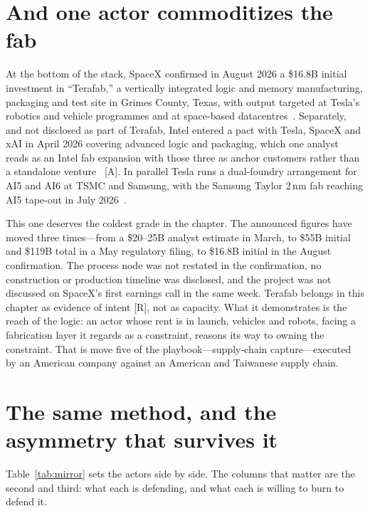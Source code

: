 \section{And one actor commoditizes the fab}
\label{sec:mirror-fab}

At the bottom of the stack, SpaceX confirmed in August 2026 a \$16.8B initial investment in ``Terafab,'' a vertically integrated logic and memory manufacturing, packaging and test site in Grimes County, Texas, with output targeted at Tesla's robotics and vehicle programmes and at space-based datacentres~\cite{terafab}. Separately, and not disclosed as part of Terafab, Intel entered a pact with Tesla, SpaceX and xAI in April 2026 covering advanced logic and packaging, which one analyst reads as an Intel fab expansion with those three as anchor customers rather than a standalone venture~\cite{terafab} [A]. In parallel Tesla runs a dual-foundry arrangement for AI5 and AI6 at TSMC and Samsung, with the Samsung Taylor 2\,nm fab reaching AI5 tape-out in July 2026~\cite{tesla-ai5}.

This one deserves the coldest grade in the chapter. The announced figures have moved three times---from a \$20--25B analyst estimate in March, to \$55B initial and \$119B total in a May regulatory filing, to \$16.8B initial in the August confirmation. The process node was not restated in the confirmation, no construction or production timeline was disclosed, and the project was not discussed on SpaceX's first earnings call in the same week. Terafab belongs in this chapter as evidence of intent [R], not as capacity. What it demonstrates is the reach of the logic: an actor whose rent is in launch, vehicles and robots, facing a fabrication layer it regards as a constraint, reasons its way to owning the constraint. That is move five of the playbook---supply-chain capture---executed by an American company against an American and Taiwanese supply chain.

\section{The same method, and the asymmetry that survives it}
\label{sec:mirror-asymmetry}

Table~\ref{tab:mirror} sets the actors side by side. The columns that matter are the second and third: what each is defending, and what each is willing to burn to defend it.

